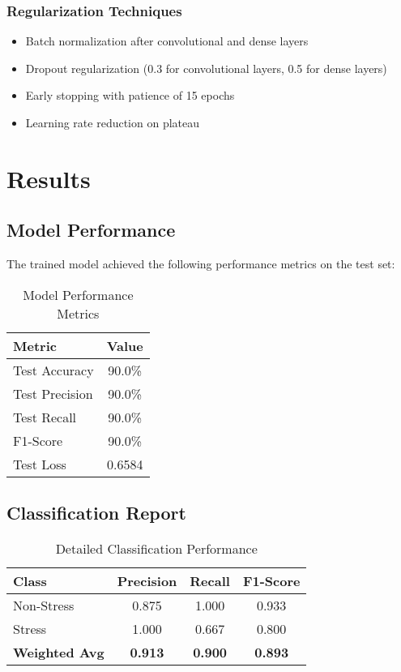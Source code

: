 \documentclass[11pt,a4paper]{article}
\begin{document}
\subsubsection{Regularization Techniques}
\begin{itemize}
    \item Batch normalization after convolutional and dense layers
    \item Dropout regularization (0.3 for convolutional layers, 0.5 for dense layers)
    \item Early stopping with patience of 15 epochs
    \item Learning rate reduction on plateau
\end{itemize}

\section{Results}

\subsection{Model Performance}

The trained model achieved the following performance metrics on the test set:

\begin{table}[H]
\centering
\caption{Model Performance Metrics}
\begin{tabular}{lc}
\toprule
Metric & Value \\
\midrule
Test Accuracy & 90.0\% \\
Test Precision & 90.0\% \\
Test Recall & 90.0\% \\
F1-Score & 90.0\% \\
Test Loss & 0.6584 \\
\bottomrule
\end{tabular}
\end{table}

\subsection{Classification Report}

\begin{table}[H]
\centering
\caption{Detailed Classification Performance}
\begin{tabular}{lccc}
\toprule
Class & Precision & Recall & F1-Score \\
\midrule
Non-Stress & 0.875 & 1.000 & 0.933 \\
Stress & 1.000 & 0.667 & 0.800 \\
\midrule
\textbf{Weighted Avg} & \textbf{0.913} & \textbf{0.900} & \textbf{0.893} \\
\bottomrule
\end{tabular}
\end{table}
\end{document}
